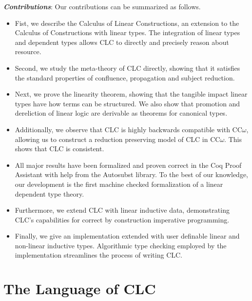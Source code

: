 \documentclass[sigplan,screen]{acmart}
\theoremstyle{definition}
\begin{document}
  \noindent \textbf{\textit{Contributions}}: 
  Our contributions can be summarized as follows.
  \begin{itemize}
    \item Fist, we describe the Calculus of Linear Constructions, an extension to the Calculus of Constructions with linear types. The integration of linear types and dependent types allows CLC to directly and precisely reason about resource.
    \item Second, we study the meta-theory of CLC directly, showing that it satisfies the standard properties of confluence, propagation and subject reduction.
    \item Next, we prove the linearity theorem, showing that the tangible impact linear types have how terms can be structured. We also show that promotion and dereliction of linear logic are derivable as theorems for canonical types.
    \item Additionally, we observe that CLC is highly backwards compatible with CC$\omega$, allowing us to construct a reduction preserving model of CLC in CC$\omega$. This shows that CLC is consistent.
    \item All major results have been formalized and proven correct in the Coq Proof Assistant with help from the Autosubst \cite{autosubst} library. To the best of our knowledge, our development is the first machine checked formalization of a linear dependent type theory.
    \item Furthermore, we extend CLC with linear inductive data, demonstrating CLC's capabilities for correct by construction imperative programming.
    \item Finally, we give an implementation extended with user definable linear and non-linear inductive types. Algorithmic type checking employed by the implementation streamlines the process of writing CLC.
  \end{itemize}

  \section{The Language of CLC}
\end{document}
